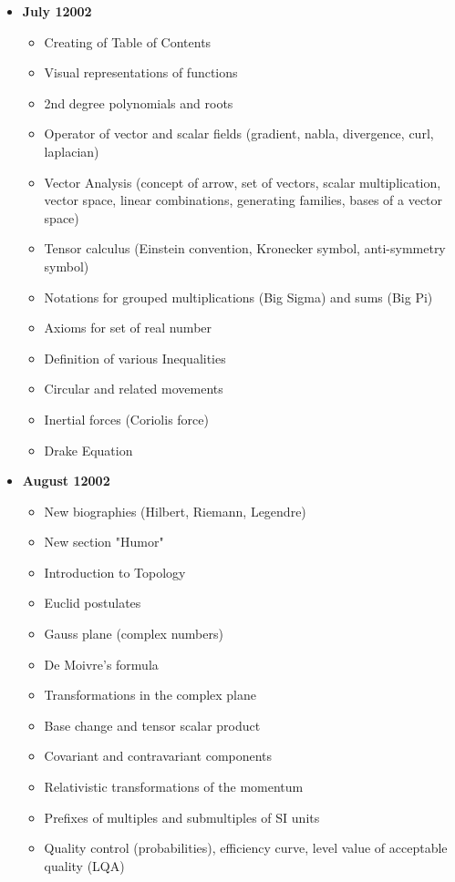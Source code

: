 \begin{itemize}
\begin{itemize}[noitemsep]
			\end{itemize}
		\item \textbf{July 12002}
			\begin{itemize}[noitemsep]
				\item Creating of Table of Contents
				\item Visual representations of functions
				\item 2nd degree polynomials and roots
				\item Operator of vector and scalar fields (gradient, nabla, divergence, curl, laplacian)
				\item Vector Analysis (concept of arrow, set of vectors, scalar multiplication, vector space, linear combinations, generating families, bases of a vector space)
				\item Tensor calculus (Einstein convention, Kronecker symbol, anti-symmetry symbol)
				\item Notations for grouped multiplications (Big Sigma) and sums (Big Pi)
				\item Axioms for set of real number 
				\item Definition of various Inequalities 
				\item Circular and related movements
				\item Inertial forces (Coriolis force)
				\item Drake Equation
			\end{itemize}
		\pagebreak
		\item \textbf{August 12002}
			\begin{itemize}[noitemsep]
				\item New biographies (Hilbert, Riemann, Legendre)
				\item New section "Humor"
				\item Introduction to Topology
				\item Euclid postulates
				\item Gauss plane (complex numbers)
				\item De Moivre's formula
				\item Transformations in the complex plane
				\item Base change and tensor scalar product
				\item Covariant and contravariant components
				\item Relativistic transformations of the momentum
				\item Prefixes of multiples and submultiples of SI units
				\item Quality control (probabilities), efficiency curve, level value of acceptable quality (LQA)

\end{itemize}
\end{itemize}
